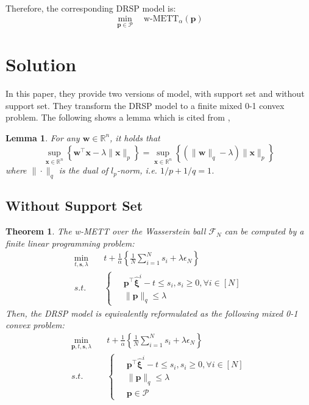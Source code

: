 \documentclass{article}
\newtheorem{thm}{Theorem}
\newtheorem{lem}{Lemma}
\begin{document}
Therefore, the corresponding DRSP model is:
\begin{equation}
	\min_{\bm{p} \in \mathcal{P}} \quad \text{w-METT}_\alpha(\bm{p})
\end{equation}

\section{Solution}

In this paper, they provide two versions of model, with support set and without support set. They transform the DRSP model to a finite mixed 0-1 convex problem. The following shows a lemma which is cited from \cite{RN372}, 

\begin{lem}  \label{lem}
	For any $\bm{w} \in \mathbb{R}^n$, it holds that 
	\begin{equation}
		\sup_{\bm{x} \in \mathbb{R}^n} \left\{\bm{w}^\top \bm{x} - \lambda \|\bm{x}\|_p\right\} = \sup_{\bm{x} \in \mathbb{R}^n} \left\{ (\|\bm{w}\|_q - \lambda) \|\bm{x}\|_p \right\}
	\end{equation}
	where $\| \cdot \|_q$ is the dual of $l_p$-norm, i.e. $1/p + 1/q = 1$. 
\end{lem}

\subsection{Without Support Set}

\begin{thm}
	The w-METT over the Wasserstein ball $\mathcal{F}_N$ can be computed by a finite linear programming problem:
	\begin{align}
		\min_{t, \bm{s}, \lambda} \quad & t + \frac{1}{\alpha} \left\{\frac{1}{N} \sum_{i=1}^{N}s_i + \lambda \epsilon_N\right\} \\
		s.t. \quad & \left\{
		\begin{aligned}
			\ & \bm{p}^\top \hat{\bm{\xi}}^i - t \leq s_i, s_i \geq 0, \forall i \in [N] \\
			& \|\bm{p}\|_q \leq \lambda
		\end{aligned}\right. 
	\end{align}
	Then, the DRSP model is equivalently reformulated as the following mixed 0-1 convex problem:
	\begin{align}
		\min_{\bm{p}, t, \bm{s}, \lambda} \quad & t + \frac{1}{\alpha} \left\{\frac{1}{N} \sum_{i=1}^{N} s_i + \lambda \epsilon_N\right\} \\
		s.t. \quad & \left\{
		\begin{aligned}
			\ & \bm{p}^\top \hat{\bm{\xi}}^i - t \leq s_i, s_i \geq 0, \forall i \in [N] \\
			& \|\bm{p}\|_q \leq \lambda \\
			& \bm{p} \in \mathcal{P}
		\end{aligned} \right. 
	\end{align}
\end{thm}
\end{document}
